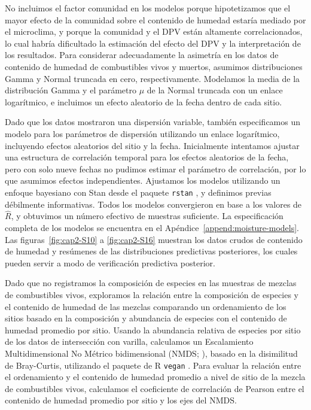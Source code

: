No incluimos el factor comunidad en los modelos porque hipotetizamos que el mayor efecto de la comunidad sobre el contenido de humedad estaría mediado por el microclima, y porque la comunidad y el DPV están altamente correlacionados, lo cual habría dificultado la estimación del efecto del DPV y la interpretación de los resultados. Para considerar adecuadamente la asimetría en los datos de contenido de humedad de combustibles vivos y muertos, asumimos distribuciones Gamma y Normal truncada en cero, respectivamente. Modelamos la media de la distribución Gamma y el parámetro $\mu$ de la Normal truncada con un enlace logarítmico, e incluimos un efecto aleatorio de la fecha dentro de cada sitio.

Dado que los datos mostraron una dispersión variable, también especificamos un modelo para los parámetros de dispersión utilizando un enlace logarítmico, incluyendo efectos aleatorios del sitio y la fecha. Inicialmente intentamos ajustar una estructura de correlación temporal para los efectos aleatorios de la fecha, pero con solo nueve fechas no pudimos estimar el parámetro de correlación, por lo que asumimos efectos independientes. Ajustamos los modelos utilizando un enfoque bayesiano con Stan \citep{carpenter_stan_2017} desde el paquete \texttt{rstan} \citep{stan_development_team_rstan_2022}, y definimos previas débilmente informativas. Todos los modelos convergieron en base a los valores de $\hat{R}$, y obtuvimos un número efectivo de muestras suficiente. La especificación completa de los modelos se encuentra en el Apéndice~\ref{append:moisture-models}. Las figuras~\ref{fig:cap2-S10} a \ref{fig:cap2-S16} muestran los datos crudos de contenido de humedad y resúmenes de las distribuciones predictivas posteriores, los cuales pueden servir a modo de verificación predictiva posterior.

Dado que no registramos la composición de especies en las muestras de mezclas de combustibles vivos, exploramos la relación entre la composición de especies y el contenido de humedad de las mezclas comparando un ordenamiento de los sitios basado en la composición y abundancia de especies con el contenido de humedad promedio por sitio. Usando la abundancia relativa de especies por sitio de los datos de intersección con varilla, calculamos un Escalamiento Multidimensional No Métrico bidimensional (NMDS; \citealt{kruskal_nonmetric_1964}), basado en la disimilitud de Bray-Curtis, utilizando el paquete de R \texttt{vegan} \citep{vegan2022}. Para evaluar la relación entre el ordenamiento y el contenido de humedad promedio a nivel de sitio de la mezcla de combustibles vivos, calculamos el coeficiente de correlación de Pearson entre el contenido de humedad promedio por sitio y los ejes del NMDS.

